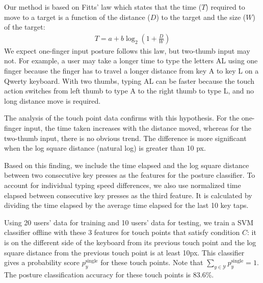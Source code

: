 \documentclass{sigchi}
\begin{document}
Our method is based on Fitts' law which states that the time ($T$) required to 
move to a target is a function of the distance ($D$) to the target and the size ($W$) of the target:
\begin{align}
T = a + b\log_2(1 + \frac{D}{W})
\end{align}                                                  
We expect one-finger input posture follows this law,  but two-thumb input may 
not. For example, a user may take a longer time to type the letters AL using one
finger because the finger has to travel a longer distance from key A to key L on
a Qwerty keyboard. With two thumbs, typing AL can be faster because the touch 
action switches from left thumb to type A to the right thumb to type L, and no 
long distance move is required.

% 

The analysis of the touch point data confirms with this hypothesis. For the 
one-finger input, the time taken increases with the distance
moved, whereas for the two-thumb input, there is no obvious trend. The
difference is more significant when the log square distance (natural log) is greater than 10 px.

Based on this finding, we include the time elapsed and the log square distance
between two consecutive key presses as the features for the posture classifier. 
To account for individual typing speed differences, we also use normalized time 
elapsed between consecutive key presses as the third feature. It is calculated 
by dividing the time elapsed by the average time elapsed for the last 10 key
taps.

Using 20 users’ data for training and 10 users’ data for testing, we train a SVM classifier offline with these 3 features for touch points that satisfy condition $C$: it is 
on the different side of the keyboard from its previous touch point and the log square distance from the previous touch point is at least 10px. This classifier gives a probability score $p_y^{\text{single}}$ for these touch points. Note that $\displaystyle\sum_{y \in \mathcal{Y}}p_y^{\text{single}} = 1$. The posture classification accuracy for these touch points is 83.6\%.
 
\end{document}
